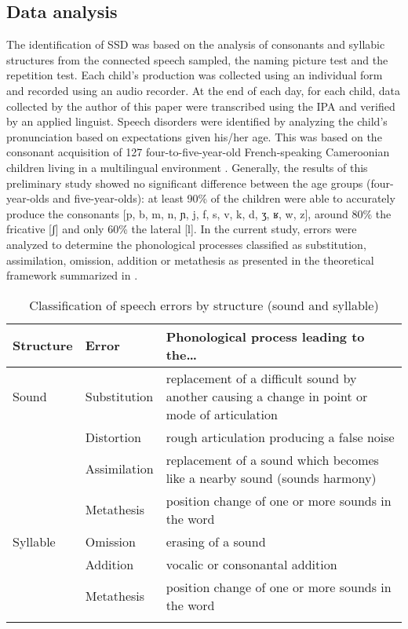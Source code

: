 \documentclass[output=paper,newtxmath,modfonts,nonflat,draftmode]{langsci/langscibook}
\begin{document}
\subsection{Data analysis} %

The identification of SSD was based on the analysis of consonants and syllabic structures from the connected speech sampled, the naming picture test and the repetition test. Each child’s production was collected using an individual form and recorded using an audio recorder. At the end of each day, for each child, data collected by the author of this paper were transcribed using the IPA and verified by an applied linguist. Speech disorders were identified by analyzing the child’s pronunciation based on expectations given his/her age. This was based on the consonant acquisition of 127 four-to-five-year-old French-speaking Cameroonian children living in a multilingual environment \citep{takamUnpublished}. Generally, the results of this preliminary study showed no significant difference between the age groups (four-year-olds and five-year-olds): at least 90\% of the children were able to accurately produce the consonants [p, b, m, n, ɲ, j, f, s, v, k, d, ʒ, ʁ, w, z], around 80\% the fricative [ʃ] and only 60\% the lateral [l]. In the current study, errors were analyzed to determine the phonological processes classified as substitution, assimilation, omission, addition or metathesis as presented in the theoretical framework summarized in . 

\begin{table}
\caption{Classification of speech errors by structure (sound and syllable)}
\begin{tabularx}{\textwidth}{llQ}
\lsptoprule
{Structure}  & {Error}  & {Phonological} {process} {leading} {to} {the…}\\
\midrule
Sound & Substitution & replacement of a difficult sound by another causing a change in point or mode of articulation\\
\tablevspace
& Distortion & rough articulation producing a false noise\\
\tablevspace
& Assimilation & replacement of a sound which becomes like a nearby sound (sounds harmony)\\
\tablevspace
& Metathesis & position change of one or more sounds in the word\\
\tablevspace
Syllable & Omission & erasing of a sound\\
\tablevspace
& Addition & vocalic or consonantal addition\\
\tablevspace
& Metathesis & position change of one or more sounds in the word\\
\lspbottomrule
\end{tabularx}
\label{tab:takam:2}
\end{table}
\end{document}
